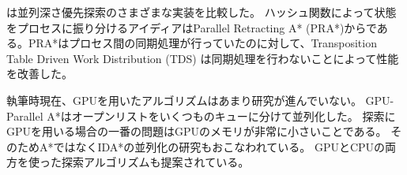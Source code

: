 
\cite{kumar1988parallel}は並列深さ優先探索のさまざまな実装を比較した。
ハッシュ関数によって状態をプロセスに振り分けるアイディアはParallel Retracting A* (PRA*)からである\cite{evett1995massively}。PRA*はプロセス間の同期処理が行っていたのに対して、Transposition Table Driven Work Distribution (TDS) \cite{romein1999transposition}は同期処理を行わないことによって性能を改善した。

執筆時現在、GPUを用いたアルゴリズムはあまり研究が進んでいない。
GPU-Parallel A*はオープンリストをいくつものキューに分けて並列化した\cite{zhou2015massively}。
探索にGPUを用いる場合の一番の問題はGPUのメモリが非常に小さいことである。
そのためA*ではなくIDA*の並列化の研究もおこなわれている\cite{horie2017block}。
GPUとCPUの両方を使った探索アルゴリズムも提案されている\cite{sulewskiek11}。

% 
% 


